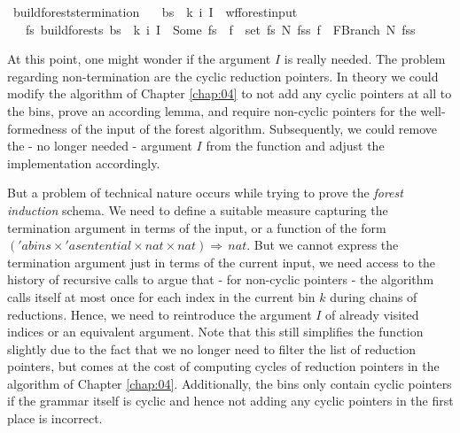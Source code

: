 \begin{isabellebody}
\isanewline
{}\isamarkupfalse%
\ build{\isacharunderscore}{\kern0pt}forests{\isacharprime}{\kern0pt}{\isacharunderscore}{\kern0pt}termination{\isacharcolon}{\kern0pt}\isanewline
\ \ \ {\isachardoublequoteopen}{\isacharparenleft}{\kern0pt}bs{\isacharcomma}{\kern0pt}\ {\isasymomega}{\isacharcomma}{\kern0pt}\ k{\isacharcomma}{\kern0pt}\ i{\isacharcomma}{\kern0pt}\ I{\isacharparenright}{\kern0pt}\ {\isasymin}\ wf{\isacharunderscore}{\kern0pt}forest{\isacharunderscore}{\kern0pt}input{\isachardoublequoteclose}\isanewline
\ \ \ {\isachardoublequoteopen}{\isasymexists}fs{\isachardot}{\kern0pt}\ build{\isacharunderscore}{\kern0pt}forests{\isacharprime}{\kern0pt}\ bs\ {\isasymomega}\ k\ i\ I\ {\isacharequal}{\kern0pt}\ Some\ fs\ {\isasymand}\ {\isacharparenleft}{\kern0pt}{\isasymforall}f\ {\isasymin}\ set\ fs{\isachardot}{\kern0pt}\ {\isasymexists}N\ fss{\isachardot}{\kern0pt}\ f\ {\isacharequal}{\kern0pt}\ FBranch\ N\ fss{\isacharparenright}{\kern0pt}{\isachardoublequoteclose}%
\isadelimproof
%
\endisadelimproof
%
\isatagproof
%
\endisatagproof
{\isafoldproof}%
%
\isadelimproof
%
\endisadelimproof
%
\begin{isamarkuptext}%
At this point, one might wonder if the argument $I$ is really needed. The problem regarding non-termination
are the cyclic reduction pointers. In theory we could modify the algorithm of Chapter \ref{chap:04} to not
add any cyclic pointers at all to the bins, prove an according lemma, and require non-cyclic pointers
for the well-formedness of the input of the forest algorithm. Subsequently, we could remove the - no longer
needed - argument $I$ from the function  and adjust the implementation accordingly.

But a problem of technical nature occurs while trying to prove the \textit{forest induction} schema.
We need to define a suitable measure capturing the termination argument in terms of the input, or a function
of the form $('a \mathit{bins} \times 'a \mathit{sentential} \times \mathit{nat} \times \mathit{nat}) \Rightarrow \, \mathit{nat}$.
But we cannot express the termination argument just in terms of the current input, we need access to
the history of recursive calls to argue that - for non-cyclic pointers - the algorithm calls itself
at most once for each index in the current bin $k$ during chains of reductions. Hence, we need to reintroduce
the argument $I$ of already visited indices or an equivalent argument. Note that this still simplifies
the function  slightly due to the fact that we no longer need to filter the list
of reduction pointers, but comes at the cost of computing cycles of reduction pointers in the algorithm
of Chapter \ref{chap:04}. Additionally, the bins only contain cyclic pointers if the grammar itself is
cyclic and hence not adding any cyclic pointers in the first place is incorrect.


\end{isamarkuptext}
\end{isabellebody}

